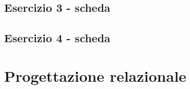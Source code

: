 \documentclass[12pt, a4paper, oneside]{book}
\begin{document}








    \subsection{Esercizio 3 - scheda}

    \subsection{Esercizio 4 - scheda}


    \section{Progettazione relazionale}

    \subsection{}
\end{document}
